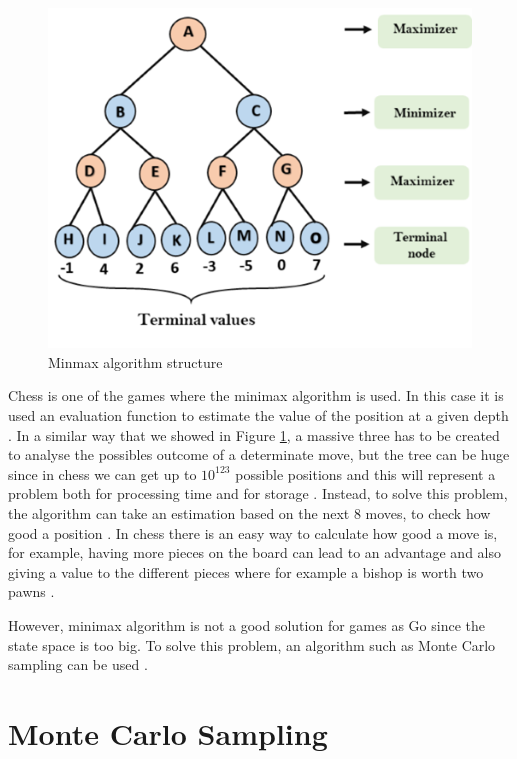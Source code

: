 \documentclass[conference]{IEEEtran}
\begin{document}
\begin{figure}[H]
\centering
\includegraphics[scale=0.55]{img/minmax.png}
\caption{Minmax algorithm structure}
\label{chess:minmax}
\end{figure}

Chess is one of the games where the minimax algorithm is used. In this case it is used an evaluation function to estimate the value of the position at a given depth \cite{alphatoe}. In a similar way that we showed in Figure \ref{chess:minmax}, a massive three has to be created to analyse the possibles outcome of a determinate move, but the tree can be huge since in chess we can get up to $10^123$ possible positions and this will represent a problem both for processing time and for storage \cite{alphatoe}. Instead, to solve this problem, the algorithm can take an estimation based on the next 8 moves, to check how good a position \cite{alphatoe}. In chess there is an easy way to calculate how good a move is, for example, having more pieces on the board can lead to an advantage and also giving a value to the different pieces where for example a bishop is worth two pawns \cite{alphatoe}.

However, minimax algorithm is not a good solution for games as Go since the state space is too big. To solve this problem, an algorithm such as Monte Carlo sampling can be used \cite{alphatoe}.

\section{Monte Carlo Sampling}
\end{document}
